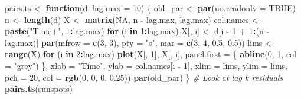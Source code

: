 \documentclass[]{book}
\newenvironment{Shaded}{\begin{snugshade}}{\end{snugshade}}
\newcommand{\KeywordTok}[1]{\textcolor[rgb]{0.13,0.29,0.53}{\textbf{#1}}}
\newcommand{\DataTypeTok}[1]{\textcolor[rgb]{0.13,0.29,0.53}{#1}}
\newcommand{\DecValTok}[1]{\textcolor[rgb]{0.00,0.00,0.81}{#1}}
\newcommand{\FloatTok}[1]{\textcolor[rgb]{0.00,0.00,0.81}{#1}}
\newcommand{\StringTok}[1]{\textcolor[rgb]{0.31,0.60,0.02}{#1}}
\newcommand{\CommentTok}[1]{\textcolor[rgb]{0.56,0.35,0.01}{\textit{#1}}}
\newcommand{\OtherTok}[1]{\textcolor[rgb]{0.56,0.35,0.01}{#1}}
\newcommand{\ControlFlowTok}[1]{\textcolor[rgb]{0.13,0.29,0.53}{\textbf{#1}}}
\newcommand{\OperatorTok}[1]{\textcolor[rgb]{0.81,0.36,0.00}{\textbf{#1}}}
\newcommand{\NormalTok}[1]{#1}
\begin{document}
\begin{Shaded}
\begin{Highlighting}[]
\NormalTok{pairs.ts <-}\StringTok{ }\ControlFlowTok{function}\NormalTok{(d, }\DataTypeTok{lag.max =} \DecValTok{10}\NormalTok{) \{}
\NormalTok{    old_par <-}\StringTok{ }\KeywordTok{par}\NormalTok{(}\DataTypeTok{no.readonly =} \OtherTok{TRUE}\NormalTok{)}
\NormalTok{    n <-}\StringTok{ }\KeywordTok{length}\NormalTok{(d)}
\NormalTok{    X <-}\StringTok{ }\KeywordTok{matrix}\NormalTok{(}\OtherTok{NA}\NormalTok{, n }\OperatorTok{-}\StringTok{ }\NormalTok{lag.max, lag.max)}
\NormalTok{    col.names <-}\StringTok{ }\KeywordTok{paste}\NormalTok{(}\StringTok{"Time+"}\NormalTok{, }\DecValTok{1}\OperatorTok{:}\NormalTok{lag.max)}
    \ControlFlowTok{for}\NormalTok{ (i }\ControlFlowTok{in} \DecValTok{1}\OperatorTok{:}\NormalTok{lag.max) X[, i] <-}\StringTok{ }\NormalTok{d[i }\OperatorTok{-}\StringTok{ }\DecValTok{1} \OperatorTok{+}\StringTok{ }\DecValTok{1}\OperatorTok{:}\NormalTok{(n }\OperatorTok{-}\StringTok{ }\NormalTok{lag.max)]}
    \KeywordTok{par}\NormalTok{(}\DataTypeTok{mfrow =} \KeywordTok{c}\NormalTok{(}\DecValTok{3}\NormalTok{, }\DecValTok{3}\NormalTok{), }\DataTypeTok{pty =} \StringTok{"s"}\NormalTok{, }\DataTypeTok{mar =} \KeywordTok{c}\NormalTok{(}\DecValTok{3}\NormalTok{, }\DecValTok{4}\NormalTok{, }\FloatTok{0.5}\NormalTok{, }\FloatTok{0.5}\NormalTok{))}
\NormalTok{    lims <-}\StringTok{ }\KeywordTok{range}\NormalTok{(X)}
    \ControlFlowTok{for}\NormalTok{ (i }\ControlFlowTok{in} \DecValTok{2}\OperatorTok{:}\NormalTok{lag.max) }\KeywordTok{plot}\NormalTok{(X[, }\DecValTok{1}\NormalTok{], X[, i], }\DataTypeTok{panel.first =}\NormalTok{ \{}
        \KeywordTok{abline}\NormalTok{(}\DecValTok{0}\NormalTok{, }\DecValTok{1}\NormalTok{, }\DataTypeTok{col =} \StringTok{"grey"}\NormalTok{)}
\NormalTok{    \}, }\DataTypeTok{xlab =} \StringTok{"Time"}\NormalTok{, }\DataTypeTok{ylab =}\NormalTok{ col.names[i }\OperatorTok{-}\StringTok{ }\DecValTok{1}\NormalTok{], }\DataTypeTok{xlim =}\NormalTok{ lims, }\DataTypeTok{ylim =}\NormalTok{ lims, }\DataTypeTok{pch =} \DecValTok{20}\NormalTok{, }
        \DataTypeTok{col =} \KeywordTok{rgb}\NormalTok{(}\DecValTok{0}\NormalTok{, }\DecValTok{0}\NormalTok{, }\DecValTok{0}\NormalTok{, }\FloatTok{0.25}\NormalTok{))}
    \KeywordTok{par}\NormalTok{(old_par)}
\NormalTok{\}}
\CommentTok{# Look at lag k residuals}
\KeywordTok{pairs.ts}\NormalTok{(sunspots)}
\end{Highlighting}
\end{Shaded}
\end{document}
